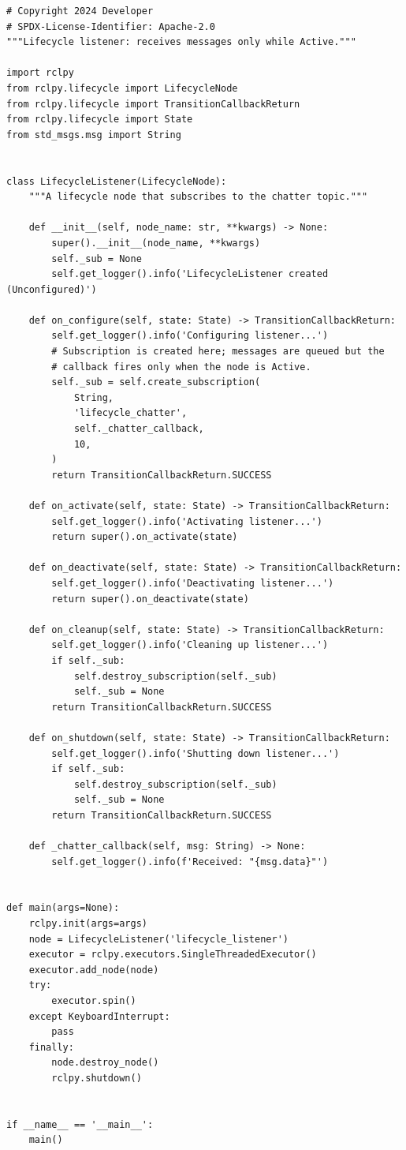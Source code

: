 \documentclass[11pt,a4paper]{csarticle}
\begin{document}
\begin{lstlisting}[style=python,caption={lifecycle\_listener.py}]
# Copyright 2024 Developer
# SPDX-License-Identifier: Apache-2.0
"""Lifecycle listener: receives messages only while Active."""

import rclpy
from rclpy.lifecycle import LifecycleNode
from rclpy.lifecycle import TransitionCallbackReturn
from rclpy.lifecycle import State
from std_msgs.msg import String


class LifecycleListener(LifecycleNode):
    """A lifecycle node that subscribes to the chatter topic."""

    def __init__(self, node_name: str, **kwargs) -> None:
        super().__init__(node_name, **kwargs)
        self._sub = None
        self.get_logger().info('LifecycleListener created (Unconfigured)')

    def on_configure(self, state: State) -> TransitionCallbackReturn:
        self.get_logger().info('Configuring listener...')
        # Subscription is created here; messages are queued but the
        # callback fires only when the node is Active.
        self._sub = self.create_subscription(
            String,
            'lifecycle_chatter',
            self._chatter_callback,
            10,
        )
        return TransitionCallbackReturn.SUCCESS

    def on_activate(self, state: State) -> TransitionCallbackReturn:
        self.get_logger().info('Activating listener...')
        return super().on_activate(state)

    def on_deactivate(self, state: State) -> TransitionCallbackReturn:
        self.get_logger().info('Deactivating listener...')
        return super().on_deactivate(state)

    def on_cleanup(self, state: State) -> TransitionCallbackReturn:
        self.get_logger().info('Cleaning up listener...')
        if self._sub:
            self.destroy_subscription(self._sub)
            self._sub = None
        return TransitionCallbackReturn.SUCCESS

    def on_shutdown(self, state: State) -> TransitionCallbackReturn:
        self.get_logger().info('Shutting down listener...')
        if self._sub:
            self.destroy_subscription(self._sub)
            self._sub = None
        return TransitionCallbackReturn.SUCCESS

    def _chatter_callback(self, msg: String) -> None:
        self.get_logger().info(f'Received: "{msg.data}"')


def main(args=None):
    rclpy.init(args=args)
    node = LifecycleListener('lifecycle_listener')
    executor = rclpy.executors.SingleThreadedExecutor()
    executor.add_node(node)
    try:
        executor.spin()
    except KeyboardInterrupt:
        pass
    finally:
        node.destroy_node()
        rclpy.shutdown()


if __name__ == '__main__':
    main()
\end{lstlisting}
\end{document}
